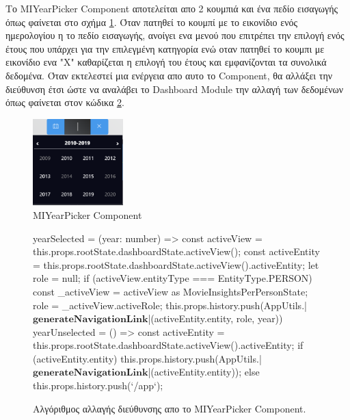 Το MIYearPicker Component αποτελείται απο 2 κουμπιά και ένα πεδίο εισαγωγής όπως φαίνεται στο σχήμα \ref{layout:miyearpicker}. Όταν πατηθεί το κουμπί με το εικονίδιο ενός ημερολογίου η το πεδίο εισαγωγής, ανοίγει ενα μενού που επιτρέπει την επιλογή ενός έτους που υπάρχει για την επιλεγμένη κατηγορία ενώ οταν πατηθεί το κουμπι με εικονίδιο ενα "Χ" καθαρίζεται η επιλογή του έτους και εμφανίζονται τα συνολικά δεδομένα. Όταν εκτελεστεί μια ενέργεια απο αυτο το Component, θα αλλάξει την διεύθυνση έτσι ώστε να αναλάβει το Dashboard Module την αλλαγή των δεδομένων όπως φαίνεται στον κώδικα \ref{code:miyearpicker_urlchanger}.
\begin{figure}[h]
  \centering
  \includegraphics[width=35mm]{Chapters/5 - Architecture/Client/Images/miyearpicker.png}
  \caption{MIYearPicker Component}
  \label{layout:miyearpicker}
\end{figure}

\begin{figure}[h]
    \begin{TypeScriptcode}
yearSelected = (year: number) => {
  const activeView = this.props.rootState.dashboardState.activeView();
  const activeEntity = this.props.rootState.dashboardState.activeView().activeEntity;
  let role = null;
  if (activeView.entityType === EntityType.PERSON) {
    const _activeView = activeView as MovieInsightsPerPersonState;
    role = _activeView.activeRole;
  }
  this.props.history.push(AppUtils.|$\textbf{generateNavigationLink}$|(activeEntity.entity, role, year))
}
yearUnselected = () => {
  const activeEntity = this.props.rootState.dashboardState.activeView().activeEntity;
  if (activeEntity.entity) {
    this.props.history.push(AppUtils.|$\textbf{generateNavigationLink}$|(activeEntity.entity));
  } else {
    this.props.history.push(`/app`);
  }
}
    \end{TypeScriptcode}
    \caption{Αλγόριθμος αλλαγής διεύθυνσης απο το MIYearPicker Component.}
   \label{code:miyearpicker_urlchanger}
\end{figure}